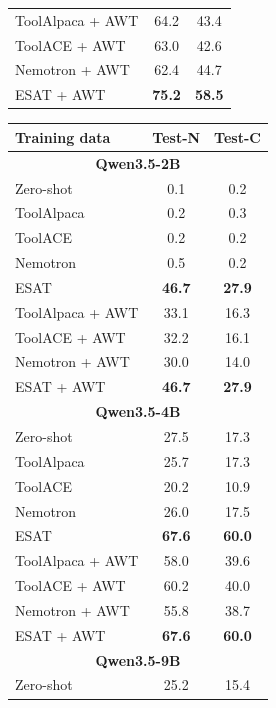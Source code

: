 \begin{table}[t!]
\begin{minipage}[c]{0.49\linewidth}
\begin{tabular}[c]{lcc}
\midrule
ToolAlpaca + AWT     & 64.2 & 43.4 \\
ToolACE + AWT        & 63.0 & 42.6 \\
Nemotron + AWT       & 62.4 & 44.7 \\
\textsc{ESAT} + AWT & \bf 75.2    & \bf  58.5 \\
\bottomrule
\end{tabular}
\end{minipage}
\begin{minipage}[c]{0.49\linewidth}
\centering
\begin{tabular}[c]{lcc}
\toprule
\bf{Training data} & \bf{Test-N} & \bf{Test-C} \\
\midrule
\multicolumn{3}{c}{\bf Qwen3.5-2B}\\
\midrule
Zero-shot & 0.1 & 0.2 \\
ToolAlpaca           &  0.2    &  0.3     \\
ToolACE              &  0.2    &  0.2    \\
Nemotron             & 0.5     &   0.2   \\
\textsc{ESAT}   & \bf 46.7 & \bf 27.9 \\
\midrule
ToolAlpaca + AWT     & 33.1 & 16.3 \\
ToolACE + AWT        & 32.2 & 16.1 \\
Nemotron + AWT       & 30.0 & 14.0 \\
\textsc{ESAT} + AWT   & \bf 46.7 & \bf 27.9 \\
\midrule
\multicolumn{3}{c}{\bf Qwen3.5-4B}\\
\midrule
Zero-shot & 27.5 & 17.3 \\
ToolAlpaca           & 25.7     &  17.3     \\
ToolACE              & 20.2     & 10.9     \\
Nemotron             & 26.0     &  17.5    \\
\textsc{ESAT}   & \bf 67.6 & \bf 60.0 \\
\midrule
ToolAlpaca + AWT     & 58.0 & 39.6 \\
ToolACE + AWT        & 60.2 & 40.0 \\
Nemotron + AWT       & 55.8 & 38.7 \\
\textsc{ESAT} + AWT   & \bf 67.6 & \bf 60.0 \\
\midrule
\multicolumn{3}{c}{\bf Qwen3.5-9B}\\
\midrule
Zero-shot & 25.2 & 15.4 \\

\end{tabular}
\end{minipage}
\end{table}
